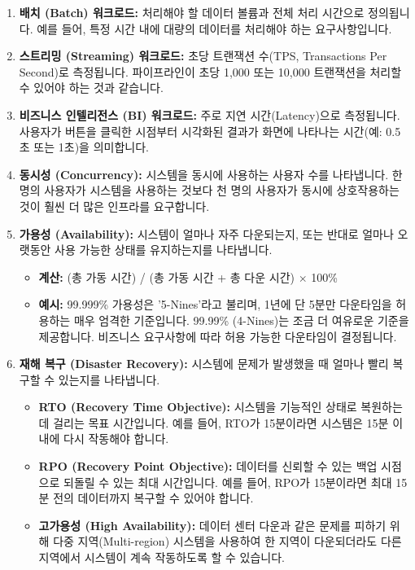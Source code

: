\documentclass[11pt,a4paper]{article}
\theoremstyle{definition}
\begin{document}
\begin{enumerate}
    \item \textbf{배치 (Batch) 워크로드:}
    처리해야 할 데이터 볼륨과 전체 처리 시간으로 정의됩니다. 예를 들어, 특정 시간 내에 대량의 데이터를 처리해야 하는 요구사항입니다.

    \item \textbf{스트리밍 (Streaming) 워크로드:}
    초당 트랜잭션 수(TPS, Transactions Per Second)로 측정됩니다. 파이프라인이 초당 1,000 또는 10,000 트랜잭션을 처리할 수 있어야 하는 것과 같습니다.

    \item \textbf{비즈니스 인텔리전스 (BI) 워크로드:}
    주로 지연 시간(Latency)으로 측정됩니다. 사용자가 버튼을 클릭한 시점부터 시각화된 결과가 화면에 나타나는 시간(예: 0.5초 또는 1초)을 의미합니다.

    \item \textbf{동시성 (Concurrency):}
    시스템을 동시에 사용하는 사용자 수를 나타냅니다. 한 명의 사용자가 시스템을 사용하는 것보다 천 명의 사용자가 동시에 상호작용하는 것이 훨씬 더 많은 인프라를 요구합니다.

    \item \textbf{가용성 (Availability):}
    시스템이 얼마나 자주 다운되는지, 또는 반대로 얼마나 오랫동안 사용 가능한 상태를 유지하는지를 나타냅니다.
    \begin{itemize}
        \item \textbf{계산:} (총 가동 시간) / (총 가동 시간 + 총 다운 시간) $\times$ 100\%
        \item \textbf{예시:} 99.999\% 가용성은 '5-Nines'라고 불리며, 1년에 단 5분만 다운타임을 허용하는 매우 엄격한 기준입니다. 99.99\% (4-Nines)는 조금 더 여유로운 기준을 제공합니다. 비즈니스 요구사항에 따라 허용 가능한 다운타임이 결정됩니다.
    \end{itemize}

    \item \textbf{재해 복구 (Disaster Recovery):}
    시스템에 문제가 발생했을 때 얼마나 빨리 복구할 수 있는지를 나타냅니다.
    \begin{itemize}
        \item \textbf{RTO (Recovery Time Objective):} 시스템을 기능적인 상태로 복원하는 데 걸리는 목표 시간입니다. 예를 들어, RTO가 15분이라면 시스템은 15분 이내에 다시 작동해야 합니다.
        \item \textbf{RPO (Recovery Point Objective):} 데이터를 신뢰할 수 있는 백업 시점으로 되돌릴 수 있는 최대 시간입니다. 예를 들어, RPO가 15분이라면 최대 15분 전의 데이터까지 복구할 수 있어야 합니다.
        \item \textbf{고가용성 (High Availability):} 데이터 센터 다운과 같은 문제를 피하기 위해 다중 지역(Multi-region) 시스템을 사용하여 한 지역이 다운되더라도 다른 지역에서 시스템이 계속 작동하도록 할 수 있습니다.
    \end{itemize}
\end{enumerate}
\end{document}
